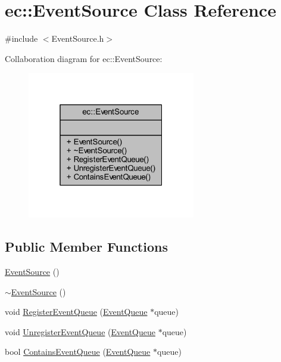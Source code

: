 \hypertarget{classec_1_1_event_source}{}\section{ec\+:\+:Event\+Source Class Reference}
\label{classec_1_1_event_source}


{\ttfamily \#include $<$Event\+Source.\+h$>$}



Collaboration diagram for ec\+:\+:Event\+Source\+:
\nopagebreak
\begin{figure}[H]
\begin{center}
\leavevmode
\includegraphics[width=208pt]{classec_1_1_event_source__coll__graph}
\end{center}
\end{figure}
\subsection*{Public Member Functions}
\begin{DoxyCompactItemize}
\item 
\mbox{\hyperlink{classec_1_1_event_source_a7ccb3e423c3009e4384a2ecf1cd48f57}{Event\+Source}} ()
\item 
\mbox{\hyperlink{classec_1_1_event_source_abac24e47613cacddde6e86da5bc1cb4c}{$\sim$\+Event\+Source}} ()
\item 
void \mbox{\hyperlink{classec_1_1_event_source_ab507e7ed5da766e1f4487375997c57ca}{Register\+Event\+Queue}} (\mbox{\hyperlink{classec_1_1_event_queue}{Event\+Queue}} $\ast$queue)
\item 
void \mbox{\hyperlink{classec_1_1_event_source_ad167ece0710a964d09c7d61faae641df}{Unregister\+Event\+Queue}} (\mbox{\hyperlink{classec_1_1_event_queue}{Event\+Queue}} $\ast$queue)
\item 
bool \mbox{\hyperlink{classec_1_1_event_source_a4c01a084d1873b42d2f7e67a57e5706d}{Contains\+Event\+Queue}} (\mbox{\hyperlink{classec_1_1_event_queue}{Event\+Queue}} $\ast$queue)
\end{DoxyCompactItemize}


